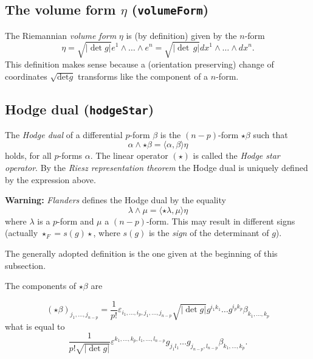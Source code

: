 \documentclass[12pt,a4paper]{article}
\begin{document}
\subsection{ The volume form $\eta$ ({\tt volumeForm})}
The Riemannian {\it volume form} $\eta$ is (by definition) given by the 
$n$-form 
\begin{displaymath}
	 \eta = \sqrt{| \det g |} e^1 \wedge \ldots \wedge e^n = 
	 \sqrt{| \det\,g |} dx^1 \wedge \ldots \wedge d x^n . \label{vol}
\end{displaymath}
This definition makes sense because a (orientation preserving) change of
coordinates $\sqrt{\mathrm{det} g}$ transforms like the component of
a $n$-form.
%

\subsection{Hodge dual ({\tt hodgeStar})}
The {\it Hodge dual} of a differential $p$-form $\beta$ is the 
$(n - p)$-form $\star \beta$ such that
\begin{displaymath}
	 \alpha \wedge \star \beta = \langle \alpha, \beta \rangle \eta 
	 \label{hodge}
\end{displaymath}
holds, for all $p$-forms $\alpha$. The linear operator $(\star)$ is 
called the {\it Hodge star operator}. By the {\it Riesz representation
theorem} the Hodge dual is uniquely defined by the expression above.
%

\noindent
{\bf Warning:} {\it Flanders} \cite{FLAN} defines the Hodge dual by the 
equality
\begin{displaymath}
	 \lambda \wedge \mu = \langle \star \lambda, \mu \rangle \eta 
\end{displaymath}
where $\lambda$ is a $p$-form and $\mu$ a $(n-p)$-form.
This may result in different signs (actually $\star_F = s(g)\star$,
where $s(g)$ is the {\it sign} of the determinant of $g$).
 
The generally adopted definition is the one given at the beginning 
of this subsection. 

The components of $\star \beta$ are

\begin{displaymath}
	(\star \beta)_{j_1, \ldots, j_{n - p}} = \frac{1}{p!} \varepsilon_{i_1,
   \ldots, i_p, j_1, \ldots, j_{n - p}}  \sqrt{| \det g |} g^{i_1 k_1} \ldots
   g^{i_p k_p} \beta_{k_1, \ldots, k_p} 
\end{displaymath}
what is equal to
\begin{displaymath}
	 \frac{1}{p! \sqrt{| \det g |}} \varepsilon_{}^{k_1, \ldots, k_p, l_1,
   \ldots, l_{n - p}} g_{j_1 l_1} \ldots g_{j_{n - p}, l_{n - p}} \beta_{k_1,
   \ldots, k_p} .
\end{displaymath}
%
\end{document}
